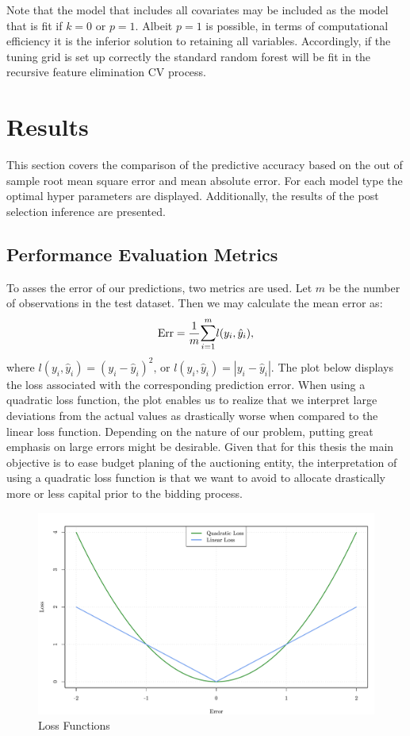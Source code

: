 \documentclass[a4paper,12pt, headsepline]{scrartcl}
\numberwithin{equation}{section}
\begin{document}
Note that the model that includes all covariates may be included  as the model that is fit if $k = 0$ or $p = 1$. Albeit $p = 1$ is possible, in terms of computational efficiency it is the inferior solution to retaining all variables. Accordingly, if the tuning grid is set up correctly the standard random forest will be fit in the recursive feature elimination CV process. 
\newpage
\section{Results}\label{sec:res}
This section covers the comparison of the predictive accuracy based on the out of sample root mean square error and mean absolute error. For each model type the optimal hyper parameters are displayed. Additionally, the results of the post selection inference are presented.

\subsection{Performance Evaluation Metrics}\label{subsec:per}
To asses the error of our predictions, two metrics are used. Let $m$ be the number of observations in the test dataset. Then we may calculate the mean error as:
\[
\text{Err} = \frac{1}{m} \mathlarger{\sum}\limits_{i = 1}^{m} l(y_i, \hat y_i),
\]
 where $l(y_i, \hat y_i) =( y_i - \hat y_i)^2 \text{, or } l(y_i, \hat y_i) = |y_i - \hat y_i|$. The plot below displays the loss associated with the corresponding prediction error. When using a quadratic loss function, the plot enables us to realize that we interpret large deviations from the actual values as drastically worse when compared to the linear loss function. Depending on the nature of our problem, putting great emphasis on large errors might be desirable. Given that for this thesis the main objective is to ease budget planing of the auctioning entity, the interpretation of using a quadratic loss function is that we want to avoid to allocate drastically more or less capital prior to the bidding process.
\begin{figure}[H]
	\includegraphics[width = 13.5	cm]{figures/Lossfun.pdf}
	\caption{Loss Functions}\label{fig:lossfun}
\end{figure}
\end{document}
